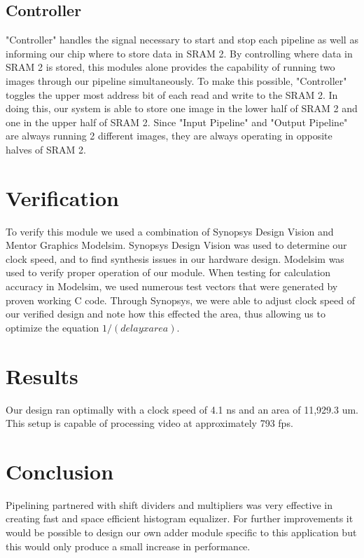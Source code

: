\documentclass[10pt]{IEEEtran}
\begin{document}
\subsection*{Controller}
"Controller" handles the signal necessary to start and stop each pipeline as well as informing our chip where to store data in SRAM 2. By controlling where data in SRAM 2 is stored, this modules alone provides the capability of running two images through our pipeline simultaneously. To make this possible, "Controller" toggles the upper most address bit of each read and write to the SRAM 2. In doing this, our system is able to store one image in the lower half of SRAM 2 and one in the upper half of SRAM 2. Since "Input Pipeline" and "Output Pipeline" are always running 2 different images, they are always operating in opposite halves of SRAM 2.

\section{Verification}
To verify this module we used a combination of Synopsys Design Vision and Mentor Graphics Modelsim. Synopsys Design Vision was used to determine our clock speed, and to find synthesis issues in our hardware design. Modelsim was used to verify proper operation of our module. When testing for calculation accuracy in Modelsim, we used numerous test vectors that were generated by proven working C code. Through Synopsys, we were able to adjust clock speed of our verified design and note how this effected the area, thus allowing us to optimize the equation $1/(delayxarea)$.

\section{Results}
Our design ran optimally with a clock speed of 4.1 ns and an area of 11,929.3 um. This setup is capable of processing video at approximately 793 fps. 

\section{Conclusion}
Pipelining partnered with shift dividers and multipliers was very effective in creating fast and space efficient histogram equalizer. For further improvements it would be possible to design our own adder module specific to this application but this would only produce a small increase in performance.

\newpage

\end{document}
